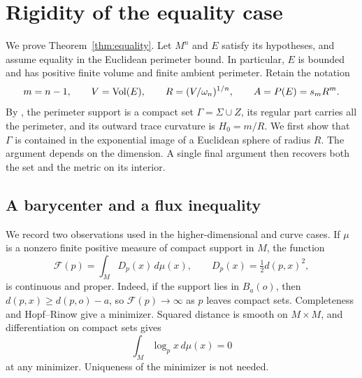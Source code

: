 \section{Rigidity of the equality case}\label{sec:rigidity}
We prove Theorem~\ref{thm:equality}. Let $M^n$ and $E$ satisfy its
hypotheses, and assume equality in the Euclidean perimeter bound.
In particular, $E$ is bounded and has positive finite volume and
finite ambient perimeter. Retain the notation
\[
 m=n-1,\qquad V=\operatorname{Vol}(E),\qquad
 R=(V/\omega_n)^{1/n},\qquad A=P(E)=s_mR^m.
\]
By , the perimeter support is a compact set
$\Gamma=\Sigma\cup Z$, its regular part carries all the perimeter,
and its outward trace curvature is $H_0=m/R$.
We first show that $\Gamma$ is contained in the exponential image of a
Euclidean sphere of radius $R$. The argument depends on the dimension.
A single final argument then recovers both the set and the metric on its
interior.

\subsection{A barycenter and a flux inequality}
We record two observations used in the higher-dimensional and curve cases.
If $\mu$ is a nonzero finite positive measure of compact support in $M$,
the function
\[
 \mathcal F(p)=\int_M D_p(x)\,d\mu(x),\qquad
 D_p(x)=\tfrac12 d(p,x)^2,
\]
is continuous and proper. Indeed, if the support lies in $B_a(o)$, then
$d(p,x)\ge d(p,o)-a$, so $\mathcal F(p)\to\infty$ as $p$ leaves compact
sets. Completeness and Hopf--Rinow give a minimizer. Squared distance is
smooth on $M\times M$, and differentiation on compact sets gives
\begin{equation}\label{eq:barycenter}
 \int_M\log_p x\,d\mu(x)=0
\end{equation}
at any minimizer. Uniqueness of the minimizer is not needed.

